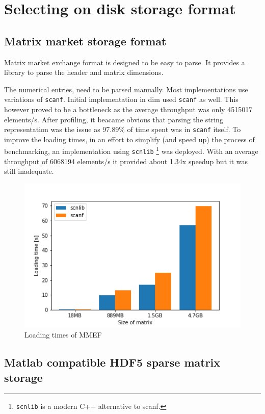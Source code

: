 \documentclass[thesis=M,english]{FITthesis}[2019/12/23]
\begin{document}
\section{Selecting on disk storage format}


\subsection{Matrix market storage format}

Matrix market exchange format is designed to be easy to parse. It provides a library to parse
the header and matrix dimensions. \cite{mmC}

The numerical entries, need to be parsed manually.
Most implementations use variations of \texttt{scanf}.
Initial implementation in dim used \texttt{scanf} as well. This however proved to be a bottleneck as
the average throughput was only 4515017 elements/s.  After profiling, it beacame obvious that parsing the string representation
was the issue as 97.89\% of time spent was in \texttt{scanf} itself.
To improve the loading times, in an effort to
simplify (and speed up) the process of benchmarking, an implementation using
\texttt{scnlib} \footnote{\texttt{scnlib} is a modern C++ alternative to scanf.}
was deployed. With an average throughput of 6068194 elements/s it provided about 1.34x speedup but it was still inadequate.

\begin{figure}[!h]
    \centering
    \includegraphics[scale=0.5]{static/MMEF_bench.png}
    \caption{Loading times of MMEF}
\end{figure}

\subsection{Matlab compatible HDF5 sparse matrix storage}
\end{document}
